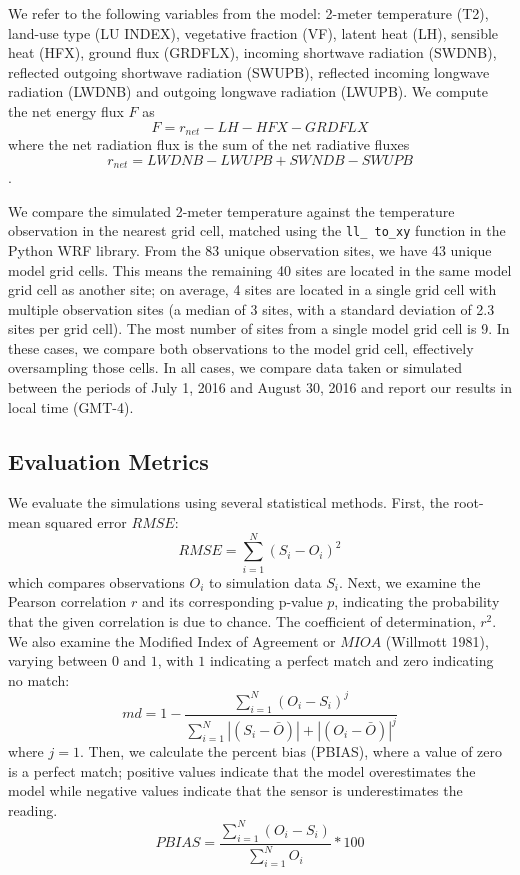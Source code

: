 \documentclass[draft,linenumbers]{agujournal}
\begin{document}
We refer to the following variables from the model: 2-meter temperature (T2),
 land-use type (LU INDEX), vegetative fraction (VF),
 latent heat (LH), 
 sensible heat (HFX), ground flux (GRDFLX), 
incoming shortwave radiation (SWDNB),
reflected outgoing shortwave radiation (SWUPB), 
reflected incoming longwave radiation (LWDNB) and outgoing longwave radiation (LWUPB).  
We compute the net energy flux $F$ as
\begin{equation}
F= r_{net} -LH - HFX - GRDFLX
\end{equation}
where the net radiation flux is the sum of the net radiative fluxes $$r_{net}=LWDNB - LWUPB+ SWNDB-SWUPB$$.

We compare the simulated 2-meter temperature against the temperature observation in the nearest grid cell, matched using the \texttt{ll\_ to\_xy} function in the Python WRF library. 
From the 83 unique observation sites, we have 43 unique model grid cells. This means the remaining 40 sites are located in the same model grid cell as another site; on average, 4 sites are located in a single grid cell with multiple observation sites (a median of 3 sites, with a standard deviation of 2.3 sites per grid cell). The most number of sites from a single model grid cell is 9. In these cases, we compare both observations to the model grid cell, effectively oversampling those cells. 
In all cases, we compare data taken or simulated between the periods of July 1, 2016 and August 30, 2016 and report our results in local time (GMT-4). 

\subsection{Evaluation Metrics}
We evaluate the simulations using several statistical methods. 
First, the root-mean squared error $RMSE$:  
\begin{equation}%
RMSE = \sum_{i=1}^{N} \left(S_i - O_i\right)^2
\end{equation}
which compares observations $O_i$ to simulation data $S_i$.
Next, we examine the Pearson correlation $r$ and its corresponding p-value $p$, indicating the probability that the given correlation is due to chance. The coefficient of determination, $r^2$. We also examine the Modified Index of Agreement or $MIOA$ (Willmott 1981), varying between \(0\) and \(1\), with \(1\) indicating a perfect match and zero indicating no match: 
\begin{equation}
md = 1 - \frac{\sum_{i=1}^{N}(O_{i}-S_{i})^{j}}{\sum_{i=1}^{N}|(S_{i}-\bar{O})|+|(O_{i}-\bar{O})|^{j}}
\end{equation}
where $j=1$. 
Then, we calculate the percent bias (PBIAS), where a value of zero is a perfect match; positive values indicate that the model overestimates the model while negative values indicate that the sensor is underestimates the reading.
\begin{equation}
PBIAS = \frac{\sum_{i=1}^{N}(O_{i}-S_{i})}{\sum_{i=1}^{N}O_{i}}*100
\end{equation}
\end{document}
